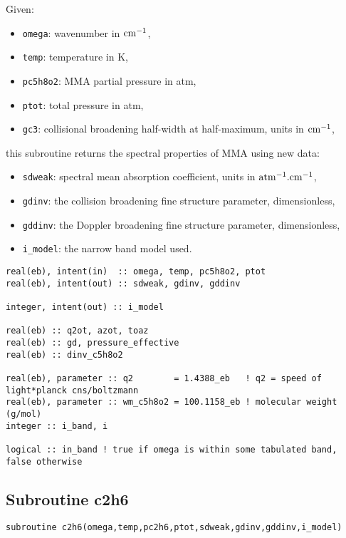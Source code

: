  Given:
\begin{itemize}
 \item \verb=omega=: wavenumber in $\rm cm^{-1}$,
 \item \verb=temp=: temperature in K,
 \item \verb=pc5h8o2=: MMA partial pressure in atm,
 \item \verb=ptot=: total pressure in atm,
 \item \verb=gc3=: collisional broadening half-width at half-maximum, units in $\rm cm^{-1}$,
\end{itemize}
this subroutine returns the spectral properties of MMA using new data:
\begin{itemize}
 \item \verb=sdweak=: spectral mean absorption coefficient, units in $\rm atm^{-1}.cm^{-1}$,
 \item \verb=gdinv=: the collision broadening fine structure parameter, dimensionless,
 \item \verb=gddinv=: the Doppler broadening fine structure parameter, dimensionless,
 \item \verb=i_model=: the narrow band model used.
\end{itemize}

\begin{lstlisting}
real(eb), intent(in)  :: omega, temp, pc5h8o2, ptot
real(eb), intent(out) :: sdweak, gdinv, gddinv

integer, intent(out) :: i_model

real(eb) :: q2ot, azot, toaz
real(eb) :: gd, pressure_effective
real(eb) :: dinv_c5h8o2

real(eb), parameter :: q2        = 1.4388_eb   ! q2 = speed of light*planck cns/boltzmann
real(eb), parameter :: wm_c5h8o2 = 100.1158_eb ! molecular weight (g/mol)
integer :: i_band, i

logical :: in_band ! true if omega is within some tabulated band, false otherwise
\end{lstlisting}

\subsection{Subroutine c2h6}
\label{sub:c2h6}
\begin{lstlisting}
subroutine c2h6(omega,temp,pc2h6,ptot,sdweak,gdinv,gddinv,i_model)
\end{lstlisting}

